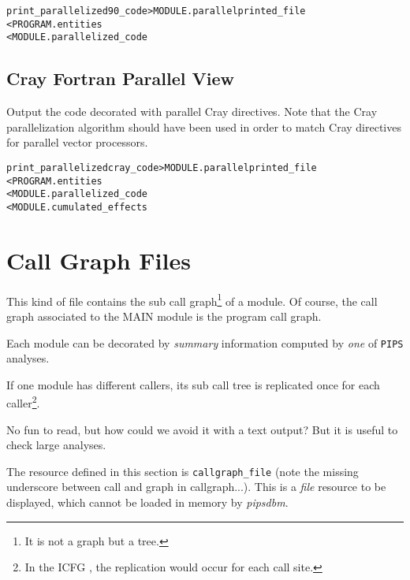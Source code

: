 \documentclass[a4paper]{report}
\newenvironment{PipsMake}{\begin{alltt}}{\end{alltt}}
\newenvironment{PipsPass}[1]{\label{pass:#1}}{}
\newcommand{\Pips}{\texttt{PIPS}}
\begin{document}
\begin{PipsMake}
print_parallelized90_code       > MODULE.parallelprinted_file
        < PROGRAM.entities
        < MODULE.parallelized_code
\end{PipsMake}


\subsection{Cray Fortran Parallel View}

\begin{PipsPass}{print_parallelizedcray_code}
Output the code decorated with parallel Cray directives. Note that the
Cray parallelization algorithm should have been used in order to match
Cray directives for parallel vector processors.
\end{PipsPass}

\begin{PipsMake}
print_parallelizedcray_code     > MODULE.parallelprinted_file
        < PROGRAM.entities
        < MODULE.parallelized_code
        < MODULE.cumulated_effects
\end{PipsMake}


\section{Call Graph Files}
\label{subsection-call-graph-files}

\begin{PipsPass}{callgraph_file}
This kind of file contains the sub call graph\footnote{It is not a
graph but a tree.} of a module. Of course, the call graph associated
to the MAIN module is the program call graph.

Each module can be decorated by {\em summary} information computed by
{\em one} of \Pips{} analyses.

If one module has different callers, its sub call tree is replicated
once for each caller\footnote{In the ICFG , the replication would
occur for each call site.}.

No fun to read, but how could we avoid it with a
text output? But it is useful to check large analyses.
\end{PipsPass}

The resource defined in this section is \verb/callgraph_file/ (note
the missing underscore between call and graph in callgraph...). This
is a {\em file} resource to be displayed, which cannot be loaded in
memory by {\em pipsdbm}.
\end{document}
